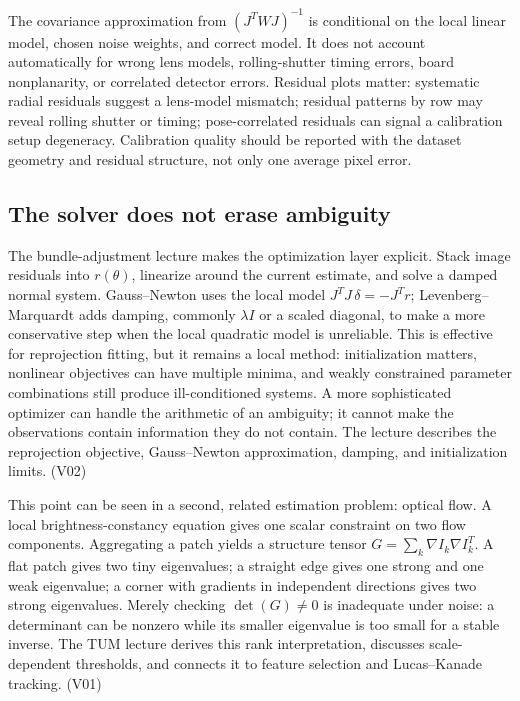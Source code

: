 The covariance approximation from \((J^T WJ)^{-1}\) is conditional on the local linear model, chosen noise weights, and correct model. It does not account automatically for wrong lens models, rolling-shutter timing errors, board nonplanarity, or correlated detector errors. Residual plots matter: systematic radial residuals suggest a lens-model mismatch; residual patterns by row may reveal rolling shutter or timing; pose-correlated residuals can signal a calibration setup degeneracy. Calibration quality should be reported with the dataset geometry and residual structure, not only one average pixel error.

\subsection{The solver does not erase ambiguity}\label{02-foundations-ii-ch036-the-solver-does-not-erase-ambiguity}

The bundle-adjustment lecture makes the optimization layer explicit. Stack image residuals into \(r(\theta)\), linearize around the current estimate, and solve a damped normal system. Gauss--Newton uses the local model \(J^TJ\,\delta=-J^Tr\); Levenberg--Marquardt adds damping, commonly \(\lambda I\) or a scaled diagonal, to make a more conservative step when the local quadratic model is unreliable. This is effective for reprojection fitting, but it remains a local method: initialization matters, nonlinear objectives can have multiple minima, and weakly constrained parameter combinations still produce ill-conditioned systems. A more sophisticated optimizer can handle the arithmetic of an ambiguity; it cannot make the observations contain information they do not contain. The lecture describes the reprojection objective, Gauss--Newton approximation, damping, and initialization limits. (V02)

This point can be seen in a second, related estimation problem: optical flow. A local brightness-constancy equation gives one scalar constraint on two flow components. Aggregating a patch yields a structure tensor \(G=\sum_k \nabla I_k\nabla I_k^T\). A flat patch gives two tiny eigenvalues; a straight edge gives one strong and one weak eigenvalue; a corner with gradients in independent directions gives two strong eigenvalues. Merely checking \(\det(G)\ne0\) is inadequate under noise: a determinant can be nonzero while its smaller eigenvalue is too small for a stable inverse. The TUM lecture derives this rank interpretation, discusses scale-dependent thresholds, and connects it to feature selection and Lucas--Kanade tracking. (V01)

